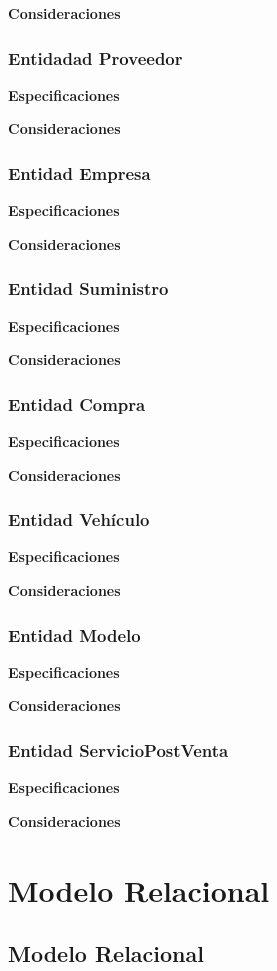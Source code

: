 \documentclass[12pt]{article}
\begin{document}
\textbf{Consideraciones}

\subsubsection{Entidadad Proveedor}
\textbf{Especificaciones}

\textbf{Consideraciones}

\subsubsection{Entidad Empresa}
\textbf{Especificaciones}

\textbf{Consideraciones}

\subsubsection{Entidad Suministro}
\textbf{Especificaciones}

\textbf{Consideraciones}

\subsubsection{Entidad Compra}
\textbf{Especificaciones}

\textbf{Consideraciones}

\subsubsection{Entidad Vehículo}
\textbf{Especificaciones}

\textbf{Consideraciones}

\subsubsection{Entidad Modelo}
\textbf{Especificaciones}

\textbf{Consideraciones}


\subsubsection{Entidad ServicioPostVenta}
\textbf{Especificaciones}

\textbf{Consideraciones}


\section{Modelo Relacional}

\subsection{Modelo Relacional}
\end{document}
